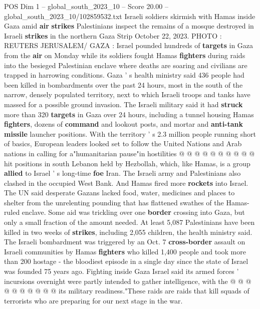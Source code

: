 \begin{textsample}{POS Dim 1 – global\_south\_2023\_10 – Score 20.00 – global\_south\_2023\_10/102859532.txt}  \label{ex:f1_pos_058}
Israeli soldiers skirmish with Hamas inside Gaza amid \textbf{air} \textbf{strikes} Palestinians inspect the remains of a mosque destroyed in Israeli \textbf{strikes} in the northern Gaza Strip October 22, 2023.
PHOTO : REUTERS JERUSALEM/ GAZA : Israel pounded hundreds of \textbf{targets} in Gaza from the \textbf{air} on Monday while its soldiers fought Hamas \textbf{fighters} during raids into the besieged Palestinian enclave where deaths are soaring and civilians are trapped in harrowing conditions.
Gaza ' s health ministry said 436 people had been killed in bombardments over the past 24 hours, most in the south of the narrow, densely populated territory, next to which Israeli troops and tanks have massed for a possible ground invasion.
The Israeli military said it had \textbf{struck} more than 320 \textbf{targets} in Gaza over 24 hours, including a tunnel housing Hamas \textbf{fighters}, dozens of \textbf{command} and lookout posts, and mortar and \textbf{anti-tank} \textbf{missile} launcher positions.
With the territory ' s 2.3 million people running short of basics, European leaders looked set to follow the United Nations and Arab nations in calling for a"humanitarian pause"in hostilities @ @ @ @ @ @ @ @ @ @ hit positions in south Lebanon held by Hezbollah, which, like Hamas, is a group \textbf{allied} to Israel ' s long-time \textbf{foe} Iran.
The Israeli army and Palestinians also clashed in the occupied West Bank.
And Hamas fired more \textbf{rockets} into Israel.
The UN said desperate Gazans lacked food, water, medicines and places to shelter from the unrelenting pounding that has flattened swathes of the Hamas-ruled enclave.
Some aid was trickling over one \textbf{border} crossing into Gaza, but only a small fraction of the amount needed.
At least 5,087 Palestinians have been killed in two weeks of \textbf{strikes}, including 2,055 children, the health ministry said.
The Israeli bombardment was triggered by an Oct. 7 \textbf{cross-border} assault on Israeli communities by Hamas \textbf{fighters} who killed 1,400 people and took more than 200 hostage - the bloodiest episode in a single day since the state of Israel was founded 75 years ago.
Fighting inside Gaza Israel said its armed forces ' incursions overnight were partly intended to gather intelligence, with the @ @ @ @ @ @ @ @ @ @ its military readiness."These raids are raids that kill squads of terrorists who are preparing for our next stage in the war.

\end{textsample}
